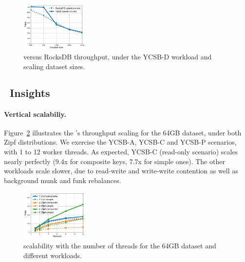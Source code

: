 \begin{figure}[t]
\centering
\includegraphics[width=0.3\textwidth]{figs/Workload_D_line.pdf}
\caption{{\sys\/ versus RocksDB throughput, under the YCSB-D workload and scaling dataset sizes.}}
\label{fig:throughput:d}
\end{figure}


\subsection{\sys\ Insights}
\label{ssec:drill} 

\paragraph{Vertical scalabiliy.} 
Figure~\ref{fig:scalability} illustrates the \sys's throughput scaling for the 64GB dataset, under both Zipf  
distributions. We exercise the YCSB-A, YCSB-C and YCSB-P scenarios, with 1 to 12 worker threads.  
As expected, YCSB-C (read-only scenario) scales nearly perfectly (9.4x for composite keys, 7.7x for simple ones). 
The other workloads scale slower, due to read-write and write-write contention as well as background munk and funk rebalances. 

\begin{figure}[th]
\centering
\includegraphics[width=0.3\textwidth]{figs/scalability_line.pdf}
\caption{{\sys\/ scalability with the number of threads for 
the 64GB dataset and different workloads. }}
\label{fig:scalability}
\end{figure}

